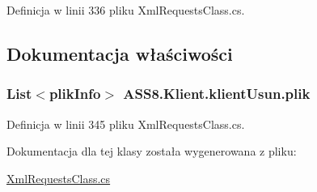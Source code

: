 Definicja w linii 336 pliku XmlRequestsClass.cs.

\subsection{Dokumentacja właściwości}
\hypertarget{a00012_65f1c0b67462c058fc083489a442d824}{
\subsubsection[{plik}]{\setlength{\rightskip}{0pt plus 5cm}List$<${\bf plikInfo}$>$ ASS8.Klient.klientUsun.plik}}
\label{df/d86/a00012_65f1c0b67462c058fc083489a442d824}




Definicja w linii 345 pliku XmlRequestsClass.cs.

Dokumentacja dla tej klasy została wygenerowana z pliku:\begin{CompactItemize}
\item 
\hyperlink{a00055}{XmlRequestsClass.cs}\end{CompactItemize}
